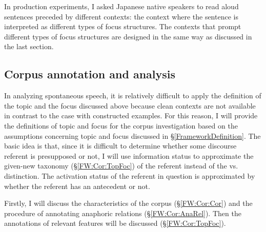 In production experiments,
I asked Japanese native speakers to read aloud sentences preceded by different contexts:
the context where the sentence is interpreted as different types of focus structures.
The contexts that prompt different types of focus structures
are designed in the same way as discussed in the last section.

\subsection{Corpus annotation and analysis}\label{FrameworkCorpus}

In analyzing spontaneous speech,
it is relatively difficult to apply the definition of the topic and the focus discussed above
because clean contexts are not available in contrast to the case with constructed examples.
For this reason,
I will provide the definitions of topic and focus for the corpus investigation
based on the assumptions concerning topic and focus discussed in \S \ref{FrameworkDefinition}.
The basic idea is that, since it is difficult to determine
whether some discourse referent is presupposed or not,
I will use information status to approximate the given-new taxonomy (\S \ref{FW:Cor:TopFoc})
of the referent
instead of the  vs.\  distinction.
The activation status of the referent in question is approximated
by whether the referent has an antecedent or not.

Firstly, I will discuss the characteristics of the corpus (\S \ref{FW:Cor:Cor})
and the procedure of annotating anaphoric relations (\S \ref{FW:Cor:AnaRel}).
Then the annotations of relevant features will be discussed (\S \ref{FW:Cor:TopFoc}).

